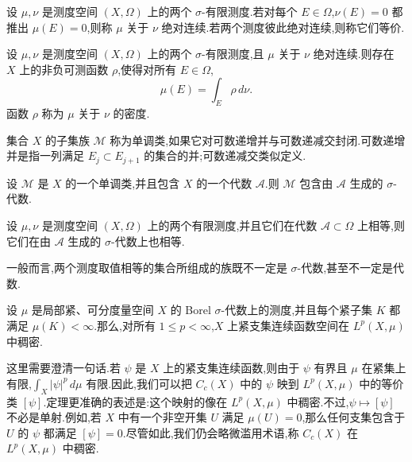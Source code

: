 \begin{definition}[绝对连续与等价测度]\label{app:def:absolute-continuity}
设 \(\mu,\nu\) 是测度空间 \((X,\Omega)\) 上的两个 \(\sigma\)-有限测度.若对每个 \(E\in\Omega\),\(\nu(E)=0\) 都推出 \(\mu(E)=0\),则称 \(\mu\) 关于 \(\nu\) 绝对连续.若两个测度彼此绝对连续,则称它们等价.
\end{definition}

\begin{theorem}\label{app:thm:radon-nikodym}
设 \(\mu,\nu\) 是测度空间 \((X,\Omega)\) 上的两个 \(\sigma\)-有限测度,且 \(\mu\) 关于 \(\nu\) 绝对连续.则存在 \(X\) 上的非负可测函数 \(\rho\),使得对所有 \(E\in\Omega\),
\[
\mu(E)=\int_E\rho\,d\nu.
\]
函数 \(\rho\) 称为 \(\mu\) 关于 \(\nu\) 的密度.
\end{theorem}

\begin{definition}[单调类]\label{app:def:monotone-class}
集合 \(X\) 的子集族 \(\mathcal M\) 称为单调类,如果它对可数递增并与可数递减交封闭.可数递增并是指一列满足 \(E_j\subset E_{j+1}\) 的集合的并;可数递减交类似定义.
\end{definition}

\begin{theorem}[单调类引理]\label{app:thm:monotone-class}
设 \(\mathcal M\) 是 \(X\) 的一个单调类,并且包含 \(X\) 的一个代数 \(\mathcal A\).则 \(\mathcal M\) 包含由 \(\mathcal A\) 生成的 \(\sigma\)-代数.
\end{theorem}

\begin{corollary}\label{app:cor:measure-agreement}
设 \(\mu,\nu\) 是测度空间 \((X,\Omega)\) 上的两个有限测度,并且它们在代数 \(\mathcal A\subset\Omega\) 上相等,则它们在由 \(\mathcal A\) 生成的 \(\sigma\)-代数上也相等.
\end{corollary}

\begin{note}
一般而言,两个测度取值相等的集合所组成的族既不一定是 \(\sigma\)-代数,甚至不一定是代数.
\end{note}

\begin{theorem}[紧支集连续函数的稠密性]\label{app:thm:cc-dense}
设 \(\mu\) 是局部紧、可分度量空间 \(X\) 的 Borel \(\sigma\)-代数上的测度,并且每个紧子集 \(K\) 都满足 \(\mu(K)<\infty\).那么,对所有 \(1\le p<\infty\),\(X\) 上紧支集连续函数空间在 \(L^p(X,\mu)\) 中稠密.
\end{theorem}

这里需要澄清一句话.若 \(\psi\) 是 \(X\) 上的紧支集连续函数,则由于 \(\psi\) 有界且 \(\mu\) 在紧集上有限,\(\int_X|\psi|^p\,d\mu\) 有限.因此,我们可以把 \(C_c(X)\) 中的 \(\psi\) 映到 \(L^p(X,\mu)\) 中的等价类 \([\psi]\).定理更准确的表述是:这个映射的像在 \(L^p(X,\mu)\) 中稠密.不过,\(\psi\mapsto[\psi]\) 不必是单射.例如,若 \(X\) 中有一个非空开集 \(U\) 满足 \(\mu(U)=0\),那么任何支集包含于 \(U\) 的 \(\psi\) 都满足 \([\psi]=0\).尽管如此,我们仍会略微滥用术语,称 \(C_c(X)\) 在 \(L^p(X,\mu)\) 中稠密.

